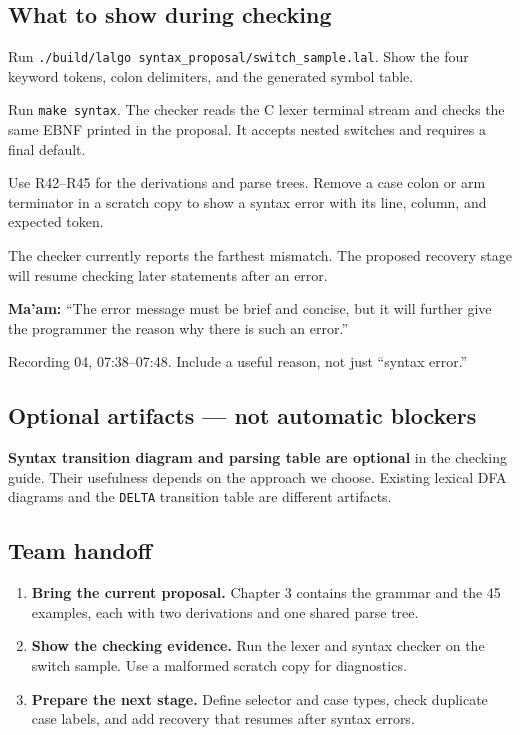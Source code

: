 \documentclass[11pt,a4paper]{article}
\newcommand{\code}[1]{\texttt{#1}}
\newcommand{\boxnote}[3]{\par\smallskip\begingroup\setlength{\fboxsep}{8pt}\colorbox{#1}{\parbox{\dimexpr\linewidth-2\fboxsep\relax}{\color{#2}\small #3}}\endgroup\par\smallskip}
\newcommand{\neutralbox}[1]{\boxnote{cream}{black}{#1}}
\newcommand{\profquote}[2]{\neutralbox{\textbf{Ma'am:} ``#1''\par{\footnotesize\color{muted}#2}}}
\begin{document}
\subsection{What to show during checking}
\begin{description}[style=nextline,leftmargin=0pt,labelindent=0pt,labelwidth=0pt,labelsep=0pt,itemsep=5pt]
\item[\textcolor{ready}{1. Scan the switch sample.}]
Run \code{./build/lalgo syntax\_proposal/switch\_sample.lal}. Show the four keyword
tokens, colon delimiters, and the generated symbol table.
\item[\textcolor{ready}{2. Check the syntax.}]
Run \code{make syntax}. The checker reads the C lexer terminal stream and checks the
same EBNF printed in the proposal. It accepts nested switches and requires a final default.
\item[\textcolor{ready}{3. Show the derivations and a diagnostic.}]
Use R42--R45 for the derivations and parse trees. Remove a case colon or arm terminator
in a scratch copy to show a syntax error with its line, column, and expected token.
\item[\textcolor{focus}{4. Implement panic recovery.}]
The checker currently reports the farthest mismatch. The proposed recovery stage will
resume checking later statements after an error.
\end{description}

\profquote{The error message must be brief and concise, but it will further give the programmer the reason why there is such an error.}{Recording 04, 07:38--07:48. Include a useful reason, not just ``syntax error.''}

\subsection{Optional artifacts --- not automatic blockers}
\neutralbox{\textbf{Syntax transition diagram and parsing table are optional} in the checking guide.
Their usefulness depends on the approach we choose. Existing lexical DFA diagrams and the
\code{DELTA} transition table are different artifacts.}

\subsection{Team handoff}
\begin{enumerate}
\item \textbf{Bring the current proposal.} Chapter 3 contains the grammar and the 45
examples, each with two derivations and one shared parse tree.
\item \textbf{Show the checking evidence.} Run the lexer and syntax checker on the switch
sample. Use a malformed scratch copy for diagnostics.
\item \textbf{Prepare the next stage.} Define selector and case types, check duplicate case
labels, and add recovery that resumes after syntax errors.
\end{enumerate}
\end{document}

